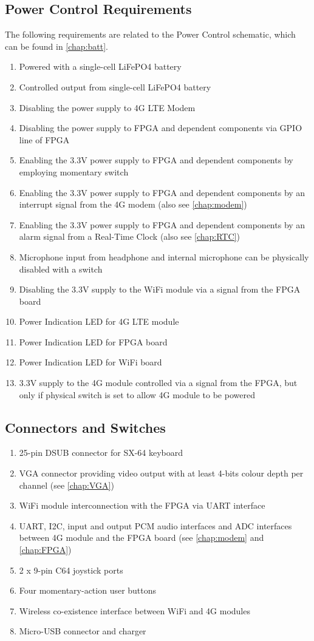 \subsection{Power Control Requirements}
The following requirements are related to the Power Control schematic, which can be found in \autoref{chap:batt}.
\begin{enumerate}
\item Powered with a single-cell LiFePO4 battery
\item Controlled output from single-cell LiFePO4 battery 
\item Disabling the power supply to 4G LTE Modem
\item Disabling the power supply to FPGA and dependent components via GPIO line of FPGA
\item Enabling the 3.3V power supply to FPGA and dependent components by employing momentary switch
\item Enabling the 3.3V power supply to FPGA and dependent components by an interrupt signal from the 4G modem (also see \autoref{chap:modem})
\item Enabling the 3.3V power supply to FPGA and dependent components by an alarm signal from a Real-Time Clock (also see \autoref{chap:RTC})
\item Microphone input from headphone and internal microphone can be physically disabled with a switch 
\item Disabling the 3.3V supply to the WiFi module via a signal from the FPGA board
\item Power Indication LED for 4G LTE module
\item Power Indication LED for FPGA board 
\item Power Indication LED for WiFi board
\item 3.3V supply to the 4G module controlled via a signal from the FPGA, but only if physical switch is set to allow 4G module to be powered
\end{enumerate}

\subsection{Connectors and Switches}
\begin{enumerate}
\item 25-pin DSUB connector for SX-64 keyboard 
\item VGA connector providing video output with at least 4-bits colour depth per channel (see \autoref{chap:VGA})
\item WiFi module interconnection with the FPGA via UART interface
\item UART, I2C, input and output PCM audio interfaces and ADC interfaces between 4G module and the FPGA board (see \autoref{chap:modem} and \autoref{chap:FPGA})
\item 2 x 9-pin C64 joystick ports
\item Four momentary-action user buttons 
\item Wireless co-existence interface between WiFi and 4G modules 
\item Micro-USB connector and charger
\end{enumerate}


